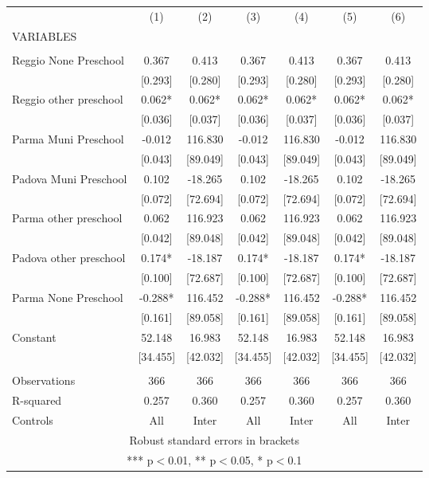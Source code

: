 \begin{tabular}{lcccccc} \hline
 & (1) & (2) & (3) & (4) & (5) & (6) \\
VARIABLES &  &  &  &  &  &  \\ \hline
 &  &  &  &  &  &  \\
Reggio None Preschool & 0.367 & 0.413 & 0.367 & 0.413 & 0.367 & 0.413 \\
 & [0.293] & [0.280] & [0.293] & [0.280] & [0.293] & [0.280] \\
Reggio other preschool & 0.062* & 0.062* & 0.062* & 0.062* & 0.062* & 0.062* \\
 & [0.036] & [0.037] & [0.036] & [0.037] & [0.036] & [0.037] \\
Parma Muni Preschool & -0.012 & 116.830 & -0.012 & 116.830 & -0.012 & 116.830 \\
 & [0.043] & [89.049] & [0.043] & [89.049] & [0.043] & [89.049] \\
Padova Muni Preschool & 0.102 & -18.265 & 0.102 & -18.265 & 0.102 & -18.265 \\
 & [0.072] & [72.694] & [0.072] & [72.694] & [0.072] & [72.694] \\
Parma other preschool & 0.062 & 116.923 & 0.062 & 116.923 & 0.062 & 116.923 \\
 & [0.042] & [89.048] & [0.042] & [89.048] & [0.042] & [89.048] \\
Padova other preschool & 0.174* & -18.187 & 0.174* & -18.187 & 0.174* & -18.187 \\
 & [0.100] & [72.687] & [0.100] & [72.687] & [0.100] & [72.687] \\
Parma None Preschool & -0.288* & 116.452 & -0.288* & 116.452 & -0.288* & 116.452 \\
 & [0.161] & [89.058] & [0.161] & [89.058] & [0.161] & [89.058] \\
Constant & 52.148 & 16.983 & 52.148 & 16.983 & 52.148 & 16.983 \\
 & [34.455] & [42.032] & [34.455] & [42.032] & [34.455] & [42.032] \\
 &  &  &  &  &  &  \\
Observations & 366 & 366 & 366 & 366 & 366 & 366 \\
R-squared & 0.257 & 0.360 & 0.257 & 0.360 & 0.257 & 0.360 \\
 Controls & All & Inter & All & Inter & All & Inter \\ \hline
\multicolumn{7}{c}{ Robust standard errors in brackets} \\
\multicolumn{7}{c}{ *** p$<$0.01, ** p$<$0.05, * p$<$0.1} \\
\end{tabular}
